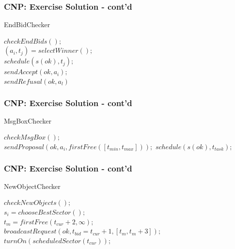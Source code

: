 \begin{frame}
	\frametitle{CNP: Exercise Solution - cont'd}
	
	\vspace{0.3cm}
	
	\begin{algorithm}[H]
		\caption{EndBidChecker}
		\BlankLine
		$ checkEndBids(); $ \\
		\BlankLine
		{
			$ (a_i,t_j) = selectWinner(); $ \\
			$ schedule(s(ok),t_j); $ \\
			$ sendAccept(ok,a_i);$ \\
			\BlankLine
			{
				$ sendRefusal(ok,a_l) $
			}
		}
	\end{algorithm}
\end{frame}

\begin{frame}
	\frametitle{CNP: Exercise Solution - cont'd}
	
	\vspace{0.3cm}
	
	\begin{algorithm}[H]
		\caption{MsgBoxChecker}
		\BlankLine
		$ checkMsgBox(); $ \\
		\BlankLine
		{
			{
				$ sendProposal(ok,a_i,firstFree([t_{min},t_{max}])); $
			}
			{
				$ schedule(s(ok),t_{task}); $
			}
		}
	\end{algorithm}
\end{frame}

\begin{frame}
	\frametitle{CNP: Exercise Solution - cont'd}
	
	\vspace{0.3cm}
	
	\begin{algorithm}[H]
		\caption{NewObjectChecker}
		\BlankLine
		$ checkNewObjects(); $ \\
		$ s_i = chooseBestSector(); $ \\
		\BlankLine
		{
			$ t_m = firstFree(t_{cur} + 2,\infty); $ \\
			$ broadcastRequest(ok,t_{bid} = t_{cur} + 1,[t_m,t_m + 3]); $
		}
		\BlankLine
		{
			$ turnOn(scheduledSector(t_{cur})); $
		}
	\end{algorithm}
\end{frame}

